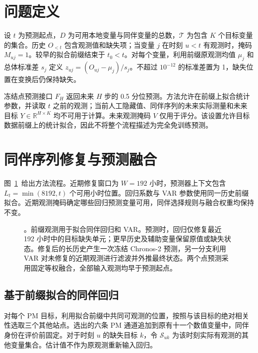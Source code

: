 \section{问题定义}
\label{sec:setting}

设 $t$ 为预测起点，$D$ 为可用本地变量与同伴变量的总数，$\mathcal T$ 为包含 $K$ 个目标变量的集合。历史 $O_{<t}$ 包含观测值和缺失项；当变量 $j$ 在时刻 $u<t$ 有观测时，掩码 $M_{uj}=1$。较早的拟合前缀结束于 $t_0<t$。对每个变量，利用前缀原观测均值 $\mu_j$ 和总体标准差 $s_j$ 定义 $z_{uj}=(O_{uj}-\mu_j)/s_j$。不超过 $10^{-12}$ 的标准差置为 1，缺失位置在变换后仍保持缺失。

冻结点预测接口 $F_H$ 返回未来 $H$ 步的 0.5 分位预测。方法允许在前缀上拟合统计参数，并读取 $t$ 之前的观测；当前人工隐藏值、同伴序列的未来实际测量和未来目标 $Y\in\mathbb R^{H\times K}$ 均不可用于计算。未来观测掩码 $V$ 仅用于评分。该设置允许目标数据前缀上的统计拟合，因此不将整个流程描述为完全免训练预测。

\section{同伴序列修复与预测融合}
\label{sec:method}

图~\ref{fig:method}~给出方法流程。近期修复窗口为 $W=192$ 小时，预测器上下文包含 $L_t=\min(8192,t)$ 个可用小时位置。回归系数与 VAR 参数使用同一历史前缀拟合。近期观测掩码确定哪些回归预测变量可用，同伴选择规则与融合权重均保持不变。

\begin{figure}[t]
\centering

\caption{\method{}。前缀观测用于拟合同伴回归和 VAR。预测时，回归仅修复最近 192 小时中的目标缺失单元；更早历史及辅助变量保留原值或缺失状态。修复后的长历史产生一次冻结 Chronos-2 预测，另一分支利用 VAR 对未修复的近期观测进行滤波并外推最终状态。两个点预测采用固定等权融合，全部输入观测均早于预测起点。}
\label{fig:method}
\end{figure}

\subsection{基于前缀拟合的同伴回归}

对每个 PM 目标，利用拟合前缀中共同可观测的位置，按照与该目标的绝对相关性选取三个其他站点。选出的六条 PM 通道追加到原有十一个数值变量中，同伴身份在评价前固定。对于时刻 $u$ 的缺失目标 $k$，令 $\mathcal S_{uk}$ 为该时刻实际有观测的其他变量集合。估计值不作为原观测重新输入回归。

